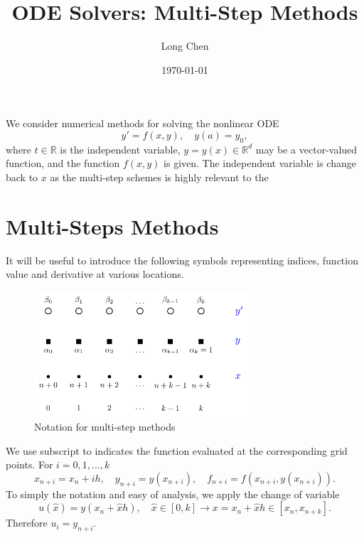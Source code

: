 \documentclass[10pt]{amsart}
\begin{document}
\title{ODE Solvers: Multi-Step Methods}
\author{Long Chen}\date{\today}
\begin{abstract}

\end{abstract}
\maketitle

\tableofcontents

We consider numerical methods for solving the nonlinear ODE  
\begin{equation}\label{ODE}  
y' = f(x, y),\quad y(a) = y_0,  
\end{equation}  
where $t \in \mathbb{R}$ is the independent variable, $y = y(x) \in \mathbb{R}^d$ may be a vector-valued function, and the function $f(x, y)$ is given. The independent variable is change back to $x$ as the multi-step schemes is highly relevant to the 

\section{Multi-Steps Methods}
It will be useful to introduce the following symbols representing indices, function value and derivative at various locations.

\begin{figure}[htbp]
\begin{center}
\includegraphics[width=8cm]{figures/multistep.pdf}
\caption{Notation for multi-step methods}
\label{fig:multistep}
\end{center}
\end{figure}

We use subscript to indicates the function evaluated at the corresponding grid points. For $i=0,1,\ldots, k$
$$
x_{n+i} = x_n + ih, \quad y_{n+i} = y(x_{n+i}), \quad f_{n+i} = f(x_{n+i}, y(x_{n+i})).
$$
To simply the notation and easy of analysis, we apply the change of variable  
$$
u(\hat x) = y(x_{n} + \hat xh), \quad \hat x\in [0,k] \to x = x_n+ \hat x h \in [x_n, x_{n+k}].
$$
Therefore $u_i = y_{n+i}$.
\end{document}
